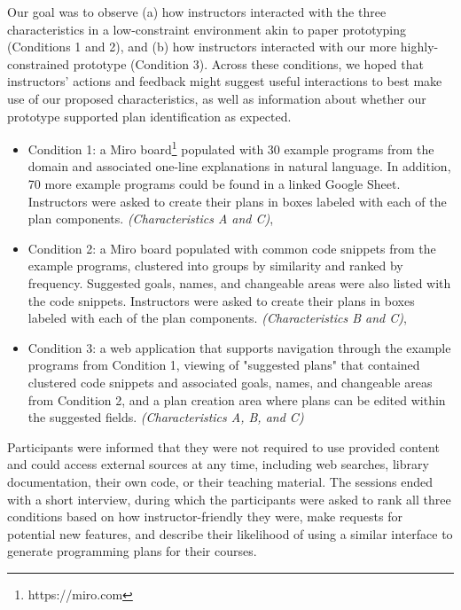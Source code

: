 Our goal was to observe (a) how instructors interacted with the three characteristics in a low-constraint environment akin to paper prototyping~\cite{Sefelin_PaperPrototyping_CHIEA-2003} (Conditions 1 and 2), and (b) how instructors interacted with our more highly-constrained prototype (Condition 3). Across these conditions, we hoped that instructors' actions and feedback might suggest useful interactions to best make use of our proposed characteristics, as well as information about whether our prototype supported plan identification as expected. 
\begin{itemize}
    \item Condition 1: a Miro board\footnote{https://miro.com} populated with 30 example programs from the domain and associated one-line explanations in natural language. In addition, 70 more example programs could be found in a linked Google Sheet. Instructors were asked to create their plans in boxes labeled with each of the plan components. \textit{(Characteristics A and C)},
    \item Condition 2: a Miro board populated with common code snippets from the example programs, clustered into groups by similarity and ranked by frequency. Suggested goals, names, and changeable areas were also listed with the code snippets. Instructors were asked to create their plans in boxes labeled with each of the plan components. \textit{(Characteristics B and C)}, %
    \item Condition 3: a web application that supports navigation through the example programs from Condition 1, viewing of "suggested plans" that contained clustered code snippets and associated goals, names, and changeable areas from Condition 2, and a plan creation area where plans can be edited within the suggested fields. \textit{(Characteristics A, B, and C)}
\end{itemize}
Participants were informed that they were not required to use provided content and could access external sources at any time, including web searches, library documentation, their own code, or their teaching material.
The sessions ended with a short interview, during which the participants were asked to rank all three conditions based on how instructor-friendly they were, make requests for potential new features, and describe their likelihood of using a similar interface to generate programming plans for their courses. 



